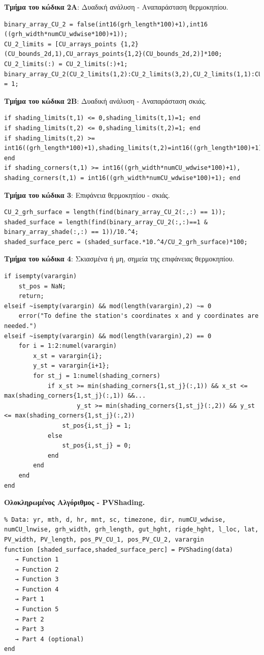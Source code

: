 \documentclass[12pt, a4paper]{report} %
\newcommand{\english}{\foreignlanguage{english}}
\begin{document}
\noindent \textbf{Τμήμα του κώδικα 2A}: Δυαδική ανάλυση - Αναπαράσταση θερμοκηπίου.
\begin{lstlisting}
binary_array_CU_2 = false(int16(grh_length*100)+1),int16 ((grh_width*numCU_wdwise*100)+1));
CU_2_limits = [CU_arrays_points {1,2}(CU_bounds_2d,1),CU_arrays_points{1,2}(CU_bounds_2d,2)]*100;
CU_2_limits(:) = CU_2_limits(:)+1;
binary_array_CU_2(CU_2_limits(1,2):CU_2_limits(3,2),CU_2_limits(1,1):CU_2_limits(3,1)) = 1;
\end{lstlisting}

\noindent \textbf{Τμήμα του κώδικα 2Β}: Δυαδική ανάλυση - Αναπαράσταση σκιάς.
\begin{lstlisting}
if shading_limits(t,1) <= 0,shading_limits(t,1)=1; end
if shading_limits(t,2) <= 0,shading_limits(t,2)=1; end
if shading_limits(t,2) >= int16((grh_length*100)+1),shading_limits(t,2)=int16((grh_length*100)+1); end
if shading_corners(t,1) >= int16((grh_width*numCU_wdwise*100)+1), shading_corners(t,1) = int16((grh_width*numCU_wdwise*100)+1); end
\end{lstlisting}

\noindent \textbf{Τμήμα του κώδικα 3}: Επιφάνεια θερμοκηπίου - σκιάς.
\begin{lstlisting}
CU_2_grh_surface = length(find(binary_array_CU_2(:,:) == 1));
shaded_surface = length(find(binary_array_CU_2(:,:)==1 & binary_array_shade(:,:) == 1))/10.^4;
shaded_surface_perc = (shaded_surface.*10.^4/CU_2_grh_surface)*100;
\end{lstlisting}

\noindent \textbf{Τμήμα του κώδικα 4}: Σκιασμένα ή μη, σημεία της επιφάνειας θερμοκηπίου.
\begin{lstlisting}
if isempty(varargin)
    st_pos = NaN;
    return;
elseif ~isempty(varargin) && mod(length(varargin),2) ~= 0
    error("To define the station's coordinates x and y coordinates are needed.")
elseif ~isempty(varargin) && mod(length(varargin),2) == 0
    for i = 1:2:numel(varargin)
        x_st = varargin{i};
        y_st = varargin{i+1};
        for st_j = 1:numel(shading_corners)
            if x_st >= min(shading_corners{1,st_j}(:,1)) && x_st <= max(shading_corners{1,st_j}(:,1)) &&...
                    y_st >= min(shading_corners{1,st_j}(:,2)) && y_st <= max(shading_corners{1,st_j}(:,2))
                st_pos{i,st_j} = 1;
            else
                st_pos{i,st_j} = 0;
            end
        end
    end
end
\end{lstlisting}

\noindent \textbf{Ολοκληρωμένος Αλγόριθμος - \english{PVShading}.} 
\begin{lstlisting}
% Data: yr, mth, d, hr, mnt, sc, timezone, dir, numCU_wdwise, numCU_lnwise, grh_width, grh_length, gut_hght, rigde_hght, l_loc, lat, PV_width, PV_length, pos_PV_CU_1, pos_PV_CU_2, varargin
function [shaded_surface,shaded_surface_perc] = PVShading(data)
   → Function 1
   → Function 2
   → Function 3
   → Function 4
   → Part 1
   → Function 5
   → Part 2
   → Part 3
   → Part 4 (optional)
end
\end{lstlisting}
\end{document}
